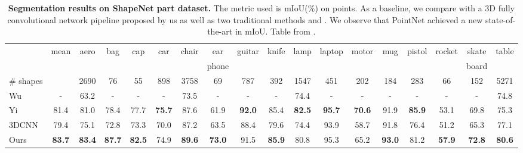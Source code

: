 \begin{table}[!ht]
    \small
    \begin{tabular}{l|c|cccccccccccccccc}
        & mean & aero & bag & cap & car & chair & ear & guitar & knife & lamp & laptop & motor & mug & pistol & rocket & skate & table \\
        & & & & & & & phone & & & & & & & & & board & \\ \hline
        \# shapes & & 2690 & 76 & 55 & 898 & 3758 & 69 & 787 & 392 & 1547 & 451 & 202 & 184 & 283 & 66 & 152 & 5271 \\ \hline
        Wu \cite{wu2014interactive} & - & 63.2 & - & - & - & 73.5 & - & - & - & 74.4 & - & - & - & - & - & - & 74.8 \\
        Yi \cite{yi2016scalable} & 81.4 & 81.0 & 78.4 & 77.7 & \textbf{75.7} & 87.6 & 61.9 & \textbf{92.0} & 85.4 & \textbf{82.5} & \textbf{95.7} & \textbf{70.6} & 91.9 & \textbf{85.9} & 53.1 & 69.8 & 75.3 \\ \hline
        3DCNN & 79.4 & 75.1 & 72.8 & 73.3 & 70.0 & 87.2 & 63.5 & 88.4 & 79.6 & 74.4 & 93.9 & 58.7 & 91.8 & 76.4 & 51.2 & 65.3 & 77.1 \\
        Ours & \textbf{83.7} & \textbf{83.4} & \textbf{87.7} & \textbf{82.5} & 74.9 & \textbf{89.6} & \textbf{73.0} & 91.5 & \textbf{85.9} & 80.8 & 95.3 & 65.2 & \textbf{93.0} & 81.2 & \textbf{57.9} & \textbf{72.8} & \textbf{80.6}
    \end{tabular}
    \caption{
        \textbf{Segmentation results on ShapeNet part dataset.} The metric used is mIoU(\%) on points.
        As a baseline, we compare with a 3D fully convolutional
        network pipeline proposed by us as well as two
        traditional methods \cite{wu2014interactive} and
        \cite{yi2016scalable}.
        We observe that PointNet achieved a new state-of-the-art
        in mIoU. Table from \cite{qi2017pointnet}.
    } \label{table:shapenet}
\end{table}

